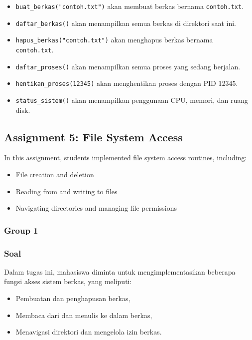 \documentclass[12pt]{article}
\begin{document}
\begin{itemize}
    \item \texttt{buat\_berkas("contoh.txt")} akan membuat berkas bernama \texttt{contoh.txt}.
    \item \texttt{daftar\_berkas()} akan menampilkan semua berkas di direktori saat ini.
    \item \texttt{hapus\_berkas("contoh.txt")} akan menghapus berkas bernama
    \\\texttt{contoh.txt}.
    \item \texttt{daftar\_proses()} akan menampilkan semua proses yang sedang berjalan.
    \item \texttt{hentikan\_proses(12345)} akan menghentikan proses dengan PID 12345.
    \item \texttt{status\_sistem()} akan menampilkan penggunaan CPU, memori, dan ruang disk.
\end{itemize}

\subsection{Assignment 5: File System Access}
In this assignment, students implemented file system access routines, including:
\begin{itemize}
    \item File creation and deletion
    \item Reading from and writing to files
    \item Navigating directories and managing file permissions
\end{itemize}

\subsubsection{Group 1}
\subsubsection*{Soal}

Dalam tugas ini, mahasiswa diminta untuk mengimplementasikan beberapa fungsi akses sistem berkas, yang meliputi:

\begin{itemize}
    \item Pembuatan dan penghapusan berkas,
    \item Membaca dari dan menulis ke dalam berkas,
    \item Menavigasi direktori dan mengelola izin berkas.
\end{itemize}
\end{document}
